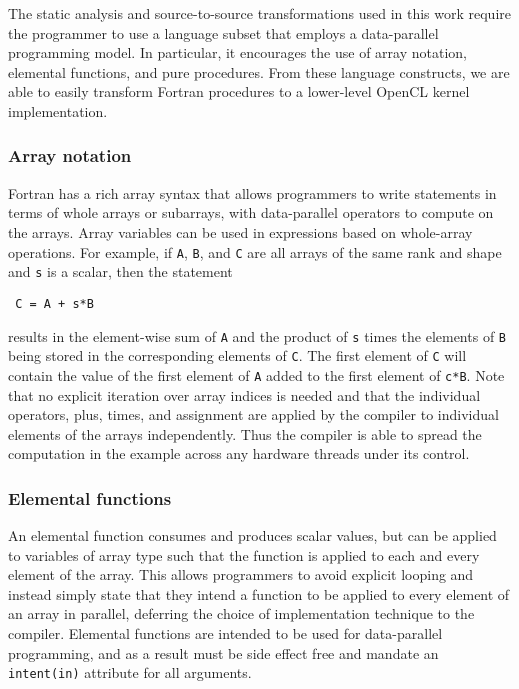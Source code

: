 The static analysis and source-to-source transformations used in this work
require the programmer to use a language subset that employs a data-parallel
programming model.  In particular, it encourages the use of array notation,
elemental functions, and pure procedures.  From these language constructs, we
are able to easily transform Fortran procedures to a lower-level OpenCL kernel
implementation.

\subsubsection*{Array notation}

Fortran has a rich array syntax that allows programmers to write statements in
terms of whole arrays or subarrays, with data-parallel operators to compute on
the arrays.  Array variables can be used in expressions based on whole-array
operations.  For example, if {\tt A}, {\tt B}, and {\tt C} are all arrays of the
same rank and shape and {\tt s} is a scalar, then the statement

{\small
\begin{verbatim}
 C = A + s*B
\end{verbatim}
}

\noindent
results in the element-wise sum of {\tt A} and the product of {\tt s} times the
elements of {\tt B} being stored in the corresponding elements of {\tt C}. The
first element of {\tt C} will contain the value of the first element of {\tt A}
added to the first element of {\tt c*B}.  Note that no explicit iteration over
array indices is needed and that the individual operators, plus, times, and
assignment are applied by the compiler to individual elements of the arrays
independently.  Thus the compiler is able to spread the computation in the
example across any hardware threads under its control.

\subsubsection*{Elemental functions}

An elemental function consumes and produces scalar values, but can be applied to
variables of array type such that the function is applied to each and every
element of the array.  This allows programmers to avoid explicit looping and
instead simply state that they intend a function to be applied to every element
of an array in parallel, deferring the choice of implementation technique to the
compiler.  Elemental functions are intended to be used for data-parallel
programming, and as a result must be side effect free and mandate an {\tt
intent(in)} attribute for all arguments.

